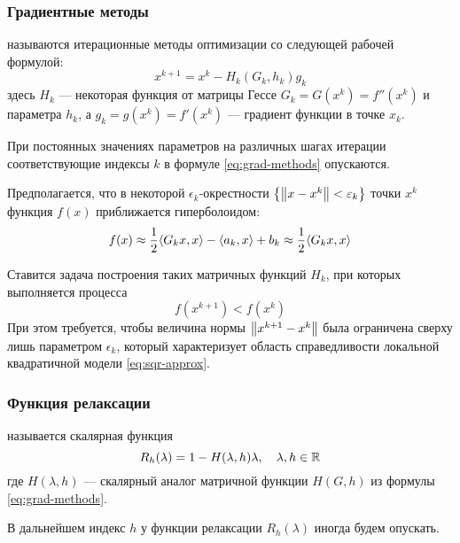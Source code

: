 \subsubsection{Градиентные методы}

\begin{dfn}
   называются итерационные методы оптимизации со
  следующей рабочей формулой:
  \begin{equation}
    \label{eq:grad-methods}
    x^{k+1} = x^k - H_k\left(G_k, h_k\right) g_k
  \end{equation}
  здесь $H_k$ — некоторая функция от матрицы Гессе $G_k = G(x^k) =
  f''(x^k)$ и параметра $h_k$, а $g_k = g(x^k) = f'(x^k)$ — градиент
  функции в точке $x_k$.
\end{dfn}

При постоянных значениях параметров на различных шагах итерации
соответствующие индексы $k$ в формуле \eqref{eq:grad-methods}
опускаются.

Предполагается, что в некоторой $\epsilon_k$-окрестности $\left\{
  \left \lVert{x-x^k}\right \rVert < \varepsilon_k\right\}$ точки $x^k$ функция $f(x)$
приближается гиперболоидом:
\begin{equation}
  \label{eq:sqr-approx}
  f(x) \approx \frac{1}{2}{\left \langle G_k x, x \right \rangle} - {\left \langle a_k,x \right \rangle} + b_k \approx \frac{1}{2}{\left \langle G_k x, x \right \rangle}
\end{equation}

Ставится задача построения таких матричных функций $H_k$, при которых
выполняется  процесса
\begin{equation}
  \label{eq:relax-cond}
  f(x^{k+1}) < f(x^k)
\end{equation}
При этом требуется, чтобы величина нормы $\left \lVert{x^{k+1}-x^{k}}\right \rVert$ была
ограничена сверху лишь параметром $\epsilon_k$, который характеризует
область справедливости локальной квадратичной модели
\eqref{eq:sqr-approx}.

\subsubsection{Функция релаксации}
\label{sec:relax}
\begin{dfn}
   называется скалярная функция
  \begin{equation}
    \label{eq:relax-fun}
    R_h(\lambda) = 1 - H(\lambda, h)\lambda,\quad \lambda,h \in \mathbb{R}
  \end{equation}
  где $H(\lambda, h)$ — скалярный аналог матричной функции $H(G, h)$
  из формулы \eqref{eq:grad-methods}.
\end{dfn}
В дальнейшем индекс $h$ у функции релаксации $R_h(\lambda)$ иногда
будем опускать.

